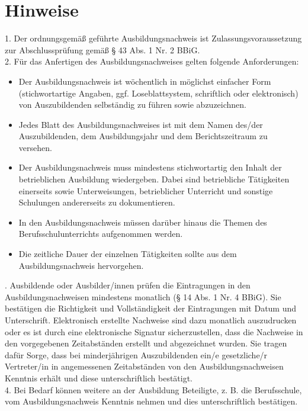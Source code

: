 \documentclass[a4paper,12pt]{article}
\begin{document}
{\small
\section*{\small Hinweise}

1. Der ordnungsgemäß geführte Ausbildungsnachweis ist Zulassungsvoraussetzung zur Abschlussprüfung gemäß § 43 Abs. 1 Nr. 2 BBiG. \hfill \break \\
2. Für das Anfertigen des Ausbildungsnachweises gelten folgende Anforderungen:
\begin{itemize}
\item Der Ausbildungsnachweis ist wöchentlich in möglichst einfacher Form (stichwortartige Angaben, ggf. Loseblattsystem, schriftlich oder elektronisch) von Auszubildenden selbständig zu führen sowie abzuzeichnen.
\item Jedes Blatt des Ausbildungsnachweises ist mit dem Namen des/der Auszubildenden, dem Ausbildungsjahr und dem Berichtszeitraum zu versehen.
\item Der Ausbildungsnachweis muss mindestens stichwortartig den Inhalt der betrieblichen Ausbildung wiedergeben. Dabei sind betriebliche Tätigkeiten einerseits sowie Unterweisungen, betrieblicher Unterricht und sonstige Schulungen andererseits zu dokumentieren.
\item In den Ausbildungsnachweis müssen darüber hinaus die Themen des Berufsschulunterrichts aufgenommen werden.
\item Die zeitliche Dauer der einzelnen Tätigkeiten sollte aus dem Ausbildungsnachweis hervorgehen.
\end{itemize} \hfill {}. Ausbildende oder Ausbilder/innen prüfen die Eintragungen in den Ausbildungsnachweisen mindestens monatlich (§ 14 Abs. 1 Nr. 4 BBiG). Sie bestätigen die Richtigkeit und Vollständigkeit der Eintragungen mit Datum und Unterschrift. Elektronisch erstellte Nachweise sind dazu monatlich auszudrucken oder es ist durch eine elektronische Signatur sicherzustellen, dass die Nachweise in den vorgegebenen Zeitabständen erstellt und abgezeichnet wurden. Sie tragen dafür Sorge, dass bei minderjährigen Auszubildenden ein/e gesetzliche/r Vertreter/in in angemessenen Zeitabständen von den Ausbildungsnachweisen Kenntnis erhält und diese unterschriftlich bestätigt. \hfill \break \\
4. Bei Bedarf können weitere an der Ausbildung Beteiligte, z. B. die Berufsschule, vom Ausbildungsnachweis Kenntnis nehmen und dies unterschriftlich bestätigen.
}

\clearpage
\end{document}
